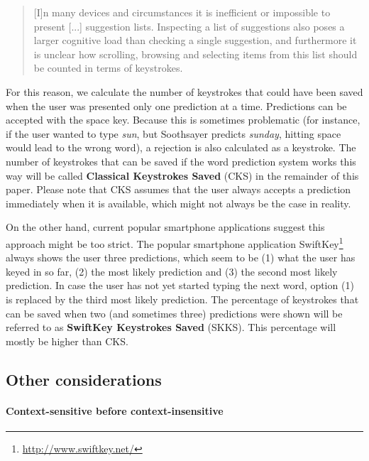\documentclass[11pt]{article}
\begin{document}
\begin{quotation}
[I]n many devices and circumstances it is inefficient or impossible to present [...] suggestion lists. Inspecting a list of suggestions also poses a larger cognitive load than checking a single suggestion, and furthermore it is unclear how scrolling, browsing and selecting items from this list should be counted in terms of keystrokes.
\end{quotation}

For this reason, we calculate the number of keystrokes that could have been saved when the user was presented only one prediction at a time. Predictions can be accepted with the space key. Because this is sometimes problematic (for instance, if the user wanted to type \emph{sun}, but Soothsayer predicts \emph{sunday}, hitting space would lead to the wrong word), a rejection is also calculated as a keystroke. The number of keystrokes that can be saved if the word prediction system works this way will be called \textbf{Classical Keystrokes Saved} (CKS) in the remainder of this paper. Please note that CKS assumes that the user always accepts a prediction immediately when it is available, which might not always be the case in reality.

On the other hand, current popular smartphone applications suggest this approach might be too strict. The popular smartphone application SwiftKey\footnote{\url{http://www.swiftkey.net/}} always shows the user three predictions, which seem to be (1) what the user has keyed in so far, (2) the most likely prediction and (3) the second most likely prediction. In case the user has not yet started typing the next word, option (1) is replaced by the third most likely prediction. The percentage of keystrokes that can be saved when two (and sometimes three) predictions were shown will be referred to as \textbf{SwiftKey Keystrokes Saved} (SKKS). This percentage will mostly be higher than CKS.

\subsection{Other considerations}

\paragraph{Context-sensitive before context-insensitive}
\end{document}
